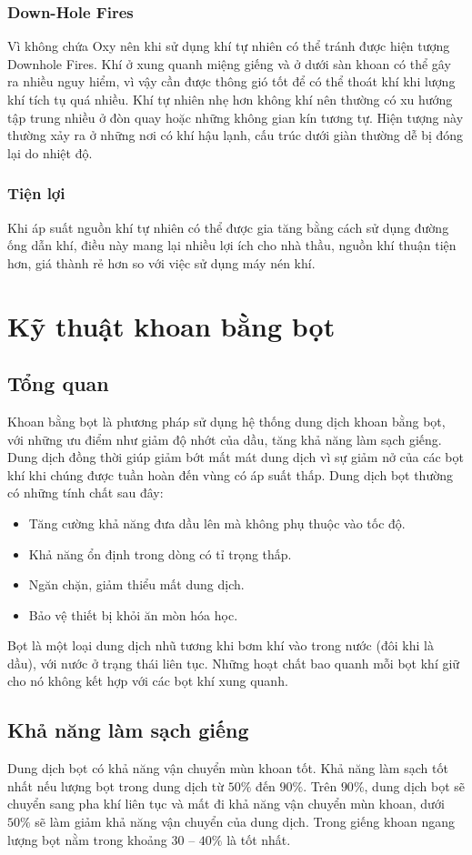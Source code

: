 \documentclass[13pt,a4paper]{article}
\begin{document}
\subsubsection{Down-Hole Fires}
	Vì không chứa Oxy nên khi sử dụng khí tự nhiên có thể tránh được hiện tượng Downhole Fires.
	Khí ở xung quanh miệng giếng và ở dưới sàn khoan có thể gây ra nhiều nguy hiểm, vì vậy cần được thông gió tốt để có thể thoát khí khi lượng khí tích tụ quá nhiều. Khí tự nhiên nhẹ hơn không khí nên thường có xu hướng tập trung nhiều ở đòn quay hoặc những không gian kín tương tự. Hiện tượng này thường xảy ra ở những nơi có khí hậu lạnh, cấu trúc dưới giàn thường dễ bị đóng lại do nhiệt độ.
\subsubsection{Tiện lợi}
	Khi áp suất nguồn khí tự nhiên có thể được gia tăng bằng cách sử dụng đường ống dẫn khí, điều này mang lại nhiều lợi ích cho nhà thầu, nguồn khí thuận tiện hơn, giá thành rẻ hơn so với việc sử dụng máy nén khí.
\section{Kỹ thuật khoan bằng bọt}
\subsection{Tổng quan}
	Khoan bằng bọt là phương pháp sử dụng hệ thống dung dịch khoan bằng bọt, với những ưu điểm như giảm độ nhớt của dầu, tăng khả năng làm sạch giếng. Dung dịch đồng thời giúp giảm bớt mất mát dung dịch vì sự giảm nở của các bọt khí khi chúng được tuần hoàn đến vùng có áp suất thấp. Dung dịch bọt thường có những tính chất sau đây:
	\begin{itemize}
		\item Tăng cường khả năng đưa dầu lên mà không phụ thuộc vào tốc độ.
		\item Khả năng ổn định trong dòng có tỉ trọng thấp.
		\item Ngăn chặn, giảm thiểu mất dung dịch.
		\item Bảo vệ thiết bị khỏi ăn mòn hóa học.
	\end{itemize}\par
	Bọt là một loại dung dịch nhũ tương khi bơm khí vào trong nước (đôi khi là dầu), với nước ở trạng thái liên tục. Những hoạt chất bao quanh mỗi bọt khí giữ cho nó không kết hợp với các bọt khí xung quanh.
\subsection{Khả năng làm sạch giếng}
	Dung dịch bọt có khả năng vận chuyển mùn khoan tốt. Khả năng làm sạch tốt nhất nếu lượng bọt trong dung dịch từ $50\%$ đến $90\%$. Trên $90\%$, dung dịch bọt sẽ chuyển sang pha khí liên tục và mất đi khả năng vận chuyển mùn khoan, dưới $50\%$ sẽ làm giảm khả năng vận chuyển của dung dịch. Trong giếng khoan ngang lượng bọt nằm trong khoảng $30$ – $40\%$ là tốt nhất.
\end{document}
